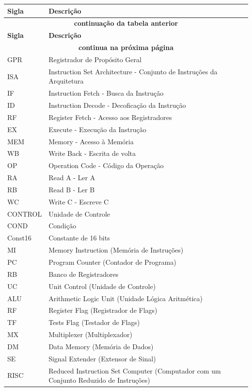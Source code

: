 \documentclass{report}
\begin{document}
\begin{center}
\begin{longtable}[pos]{|m{52pt} | m{350pt}|} \hline
	\cellcolor[gray]{0.9} \textbf{Sigla} & \cellcolor[gray]{0.9}\textbf{Descrição}\\ \hline \endfirsthead \hline
	\multicolumn{2}{|c|}{{\bfseries \textbf{continuação da tabela anterior}}} \\ \hline
	\cellcolor[gray]{0.9} \textbf{Sigla} & \cellcolor[gray]{0.9}\textbf{Descrição}\\ \hline \endhead
	\multicolumn{2}{|c|}{{\textbf{continua na próxima página}}} \\ \hline \endfoot
	\hline \endlastfoot
	
	GPR     & Registrador de Propósito Geral\\ \hline
    ISA     & Instruction Set Architecture - Conjunto de Instruções da Arquitetura\\ \hline
    IF      & Instruction Fetch - Busca da Instrução  \\ \hline
    ID      & Instruction Decode - Decoficação da Instrução \\ \hline
    RF      & Register Fetch -  Acesso aos Registradores\\ \hline
    EX      & Execute - Execução da Instrução\\ \hline
    MEM     & Memory - Acesso à Memória\\ \hline
    WB      & Write Back - Escrita de volta\\ \hline
    OP      & Operation Code - Código da Operação\\ \hline
    RA      & Read A - Ler A\\ \hline
    RB      & Read B - Ler B\\ \hline
    WC      & Write C - Escreve C\\ \hline
    CONTROL & Unidade de Controle\\ \hline
    COND    & Condição\\ \hline
    Const16 & Constante de 16 bits \\ \hline
    MI     & Memory Instruction (Memória de Instruções)\\ \hline
	PC     & Program Counter (Contador de Programa)\\ \hline
	RB     & Banco de Registradores\\ \hline
	UC     & Unit Control (Unidade de Controle)\\ \hline
	ALU    & Arithmetic Logic Unit (Unidade Lógica Aritmética)\\ \hline
	RF     & Register Flag (Registrador de Flags)\\ \hline
	TF     & Tests Flag (Testador de Flags)\\ \hline
	MX     & Multiplexer (Multiplexador)\\ \hline
	DM     & Data Memory (Memória de Dados)\\ \hline
	SE     & Signal Extender (Extensor de Sinal)\\ \hline
	RISC   & Reduced Instruction Set Computer (Computador com um Conjunto Reduzido de Instruções)\\ \hline


\end{longtable}
\end{center}
\end{document}
